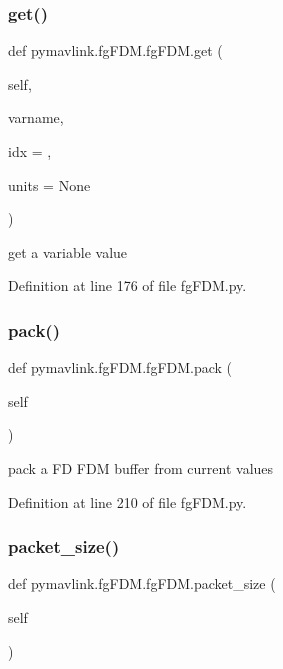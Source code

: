 \subsubsection{\texorpdfstring{get()}{get()}}
{\footnotesize\ttfamily def pymavlink.\+fg\+F\+D\+M.\+fg\+F\+D\+M.\+get (\begin{DoxyParamCaption}\item[{}]{self,  }\item[{}]{varname,  }\item[{}]{idx = {},  }\item[{}]{units = {\ttfamily None} }\end{DoxyParamCaption})}

\begin{DoxyVerb}get a variable value\end{DoxyVerb}
 

Definition at line 176 of file fg\+F\+D\+M.\+py.

\mbox{\label{classpymavlink_1_1fgFDM_1_1fgFDM_aafa38ce5a7b2976d4ad3ef0d2615df89}} 
\subsubsection{\texorpdfstring{pack()}{pack()}}
{\footnotesize\ttfamily def pymavlink.\+fg\+F\+D\+M.\+fg\+F\+D\+M.\+pack (\begin{DoxyParamCaption}\item[{}]{self }\end{DoxyParamCaption})}

\begin{DoxyVerb}pack a FD FDM buffer from current values\end{DoxyVerb}
 

Definition at line 210 of file fg\+F\+D\+M.\+py.

\mbox{\label{classpymavlink_1_1fgFDM_1_1fgFDM_ad993e23d6056391321aad8c6d4212d74}} 
\subsubsection{\texorpdfstring{packet\_size()}{packet\_size()}}
{\footnotesize\ttfamily def pymavlink.\+fg\+F\+D\+M.\+fg\+F\+D\+M.\+packet\+\_\+size (\begin{DoxyParamCaption}\item[{}]{self }\end{DoxyParamCaption})}

